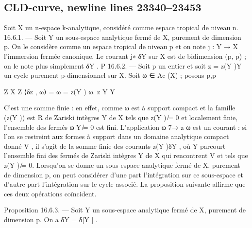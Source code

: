 \documentclass[
  10pt,
]{article}
\newenvironment{Shaded}{}{}
\newcommand{\NormalTok}[1]{#1}
\begin{document}
\subsection{CLD-curve, newline lines
23340--23453}\label{cld-curve-newline-lines-2334023453}

\begin{Shaded}
\begin{Highlighting}[]

\NormalTok{  Soit X un n{-}espace k{-}analytique, considéré comme espace tropical de niveau n.}
\NormalTok{16.6.1. — Soit Y un sous{-}espace analytique fermé de X, purement de dimension p. On}
\NormalTok{le considère comme un espace tropical de niveau p et on note j : Y → X l’immersion}
\NormalTok{fermée canonique. Le courant j∗ δY sur X est de bidimension (p, p) ; on le note plus}
\NormalTok{simplement δY .}
\NormalTok{                                        P}
\NormalTok{16.6.2. — Soit p un entier et soit z =     z(Y )Y un cycle purement p{-}dimensionnel}
\NormalTok{sur X. Soit ω ∈ Ac (X) ; posons}
\NormalTok{                  p,p}

\NormalTok{                                    Z      X        Z}
\NormalTok{                          ⟨δz , ω⟩ = ω =       z(Y ) ω.}
\NormalTok{                                         z       Y            Y}


\NormalTok{C’est une somme finie : en effet, comme ω est à support compact et la famille (z(Y )) est}
\NormalTok{                                      R de Zariski intègres Y de X tels que z(Y ) ̸= 0 et}
\NormalTok{localement finie, l’ensemble des fermés}
\NormalTok{ω|Y ̸= 0 est fini. L’application ω 7→ z ω est un courant : si l’on se restreint aux formes}
\NormalTok{à support dans un domaine analytique compact donné V , il s’agit de la somme finie des}
\NormalTok{courants z(Y )δY , où Y parcourt l’ensemble fini des fermés de Zariski intègres Y de X}
\NormalTok{qui rencontrent V et tels que z(Y ) ̸= 0.}
\NormalTok{   Lorsqu’on se donne un sous{-}espace analytique fermé de X, purement de dimension p,}
\NormalTok{on peut considérer d’une part l’intégration sur ce sous{-}espace et d’autre part l’intégration}
\NormalTok{sur le cycle associé. La proposition suivante affirme que ces deux opérations coïncident.}

\NormalTok{Proposition 16.6.3. — Soit Y un sous{-}espace analytique fermé de X, purement de}
\NormalTok{dimension p. On a δY = δ[Y ] .}


\end{Highlighting}
\end{Shaded}
\end{document}
